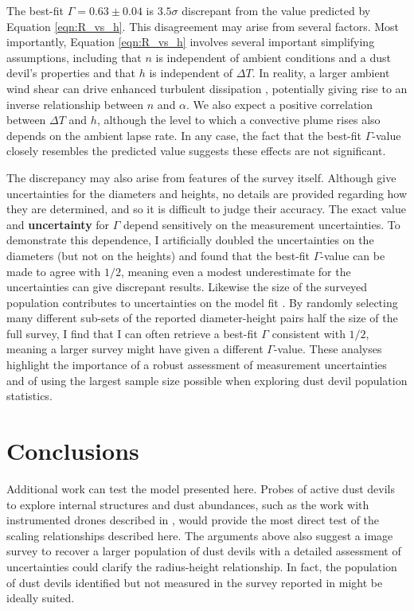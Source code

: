 \documentclass{aastex63}
\begin{document}
The best-fit $\Gamma = 0.63 \pm 0.04$ is $3.5\sigma$ discrepant from the value predicted by Equation \ref{eqn:R_vs_h}. This disagreement may arise from several factors. Most importantly, Equation \ref{eqn:R_vs_h} involves several important simplifying assumptions, including that $n$ is independent of ambient conditions and a dust devil's properties and that $h$ is independent of $\Delta T$. In reality, a larger ambient wind shear can drive enhanced turbulent dissipation \citep{arya1988}, potentially giving rise to an inverse relationship between $n$ and $\alpha$. We also expect a positive correlation between $\Delta T$ and $h$, although the level to which a convective plume rises also depends on the ambient lapse rate. In any case, the fact that the best-fit $\Gamma$-value closely resembles the predicted value suggests these effects are not significant.

The discrepancy may also arise from features of the survey itself. Although \citet{2008Icar..197...39S} give uncertainties for the diameters and heights, no details are provided regarding how they are determined, and so it is difficult to judge their accuracy. The exact value and {\bf uncertainty} for $\Gamma$ depend sensitively on the measurement uncertainties. To demonstrate this dependence, I artificially doubled the uncertainties on the diameters (but not on the heights) and found that the best-fit $\Gamma$-value can be made to agree with $1/2$, meaning even a modest underestimate for the uncertainties can give discrepant results. Likewise the size of the surveyed population contributes to uncertainties on the model fit \citep{2015JGRE..120..401J}. By randomly selecting many different sub-sets of the reported diameter-height pairs half the size of the full survey, I find that I can often retrieve a best-fit $\Gamma$ consistent with $1/2$, meaning a larger survey might have given a different $\Gamma$-value. These analyses highlight the importance of a robust assessment of measurement uncertainties and of using the largest sample size possible when exploring dust devil population statistics.

\section{Conclusions}
\label{sec:conclusions}
Additional work can test the model presented here. Probes of active dust devils to explore internal structures and dust abundances, such as the work with instrumented drones described in \citet{2018RemS...10...65J}, would provide the most direct test of the scaling relationships described here. The arguments above also suggest a image survey to recover a larger population of dust devils with a detailed assessment of uncertainties could clarify the radius-height relationship. In fact, the population of dust devils identified but not measured in the survey reported in \citet{2006JGRE..11112002C} might be ideally suited.
\end{document}

